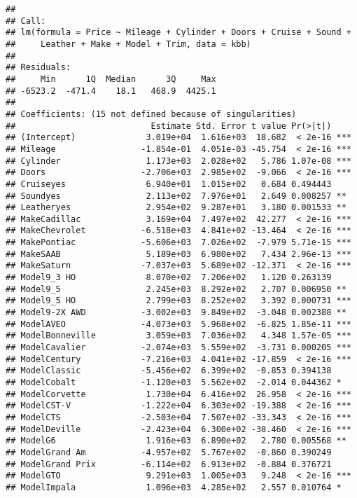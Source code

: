 \documentclass[
]{article}
\begin{document}
\begin{verbatim}
## 
## Call:
## lm(formula = Price ~ Mileage + Cylinder + Doors + Cruise + Sound + 
##     Leather + Make + Model + Trim, data = kbb)
## 
## Residuals:
##     Min      1Q  Median      3Q     Max 
## -6523.2  -471.4    18.1   468.9  4425.1 
## 
## Coefficients: (15 not defined because of singularities)
##                           Estimate Std. Error t value Pr(>|t|)    
## (Intercept)              3.019e+04  1.616e+03  18.682  < 2e-16 ***
## Mileage                 -1.854e-01  4.051e-03 -45.754  < 2e-16 ***
## Cylinder                 1.173e+03  2.028e+02   5.786 1.07e-08 ***
## Doors                   -2.706e+03  2.985e+02  -9.066  < 2e-16 ***
## Cruiseyes                6.940e+01  1.015e+02   0.684 0.494443    
## Soundyes                 2.113e+02  7.976e+01   2.649 0.008257 ** 
## Leatheryes               2.954e+02  9.287e+01   3.180 0.001533 ** 
## MakeCadillac             3.169e+04  7.497e+02  42.277  < 2e-16 ***
## MakeChevrolet           -6.518e+03  4.841e+02 -13.464  < 2e-16 ***
## MakePontiac             -5.606e+03  7.026e+02  -7.979 5.71e-15 ***
## MakeSAAB                 5.189e+03  6.980e+02   7.434 2.96e-13 ***
## MakeSaturn              -7.037e+03  5.689e+02 -12.371  < 2e-16 ***
## Model9_3 HO              8.070e+02  7.206e+02   1.120 0.263139    
## Model9_5                 2.245e+03  8.292e+02   2.707 0.006950 ** 
## Model9_5 HO              2.799e+03  8.252e+02   3.392 0.000731 ***
## Model9-2X AWD           -3.002e+03  9.849e+02  -3.048 0.002388 ** 
## ModelAVEO               -4.073e+03  5.968e+02  -6.825 1.85e-11 ***
## ModelBonneville          3.059e+03  7.036e+02   4.348 1.57e-05 ***
## ModelCavalier           -2.074e+03  5.559e+02  -3.731 0.000205 ***
## ModelCentury            -7.216e+03  4.041e+02 -17.859  < 2e-16 ***
## ModelClassic            -5.456e+02  6.399e+02  -0.853 0.394138    
## ModelCobalt             -1.120e+03  5.562e+02  -2.014 0.044362 *  
## ModelCorvette            1.730e+04  6.416e+02  26.958  < 2e-16 ***
## ModelCST-V              -1.222e+04  6.303e+02 -19.388  < 2e-16 ***
## ModelCTS                -2.503e+04  7.507e+02 -33.343  < 2e-16 ***
## ModelDeville            -2.423e+04  6.300e+02 -38.460  < 2e-16 ***
## ModelG6                  1.916e+03  6.890e+02   2.780 0.005568 ** 
## ModelGrand Am           -4.957e+02  5.767e+02  -0.860 0.390249    
## ModelGrand Prix         -6.114e+02  6.913e+02  -0.884 0.376721    
## ModelGTO                 9.291e+03  1.005e+03   9.248  < 2e-16 ***
## ModelImpala              1.096e+03  4.285e+02   2.557 0.010764 *  

\end{verbatim}
\end{document}
